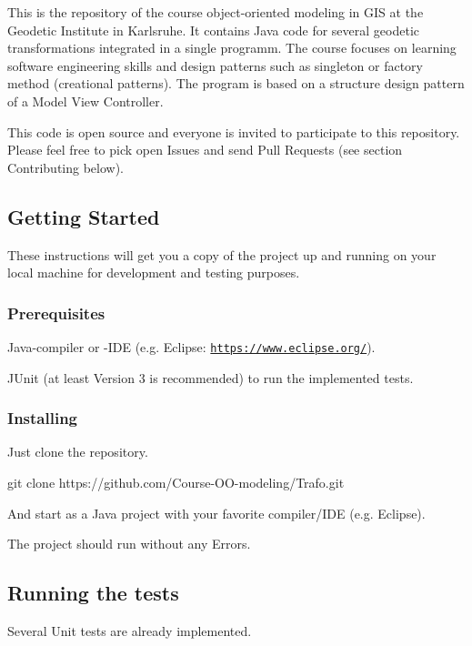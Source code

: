 This is the repository of the course object-\/oriented modeling in G\+IS at the Geodetic Institute in Karlsruhe. It contains Java code for several geodetic transformations integrated in a single programm. The course focuses on learning software engineering skills and design patterns such as singleton or factory method (creational patterns). The program is based on a structure design pattern of a Model View Controller.

This code is open source and everyone is invited to participate to this repository. Please feel free to pick open Issues and send Pull Requests (see section Contributing below).

\subsection*{Getting Started}

These instructions will get you a copy of the project up and running on your local machine for development and testing purposes.

\subsubsection*{Prerequisites}

Java-\/compiler or -\/\+I\+DE (e.\+g. Eclipse\+: \href{https://www.eclipse.org/}{\tt https\+://www.\+eclipse.\+org/}).

J\+Unit (at least Version 3 is recommended) to run the implemented tests.

\subsubsection*{Installing}

Just clone the repository.


\begin{DoxyCode}
git clone https://github.com/Course-OO-modeling/Trafo.git
\end{DoxyCode}


And start as a Java project with your favorite compiler/\+I\+DE (e.\+g. Eclipse).

The project should run without any Errors.

\subsection*{Running the tests}

Several Unit tests are already implemented.

